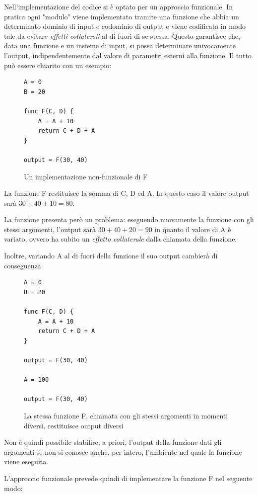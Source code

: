 \documentclass[11pt,a4paper]{report}
\newcommand{\name}[1]{{\ttfamily #1}}
\begin{document}
Nell'implementazione del codice si è optato per un approccio funzionale. In pratica ogni "modulo" viene implementato tramite una funzione che abbia un determinato dominio di input e codominio di output e viene codificata in modo tale da evitare \textit{effetti collaterali} al di fuori di se stessa. Questo garantisce che, data una funzione e un insieme di input, si possa determinare univocamente l'output, indipendentemente dal valore di parametri esterni alla funzione. Il tutto può essere chiarito con un esempio:

\begin{figure}[H]
\begin{lstlisting}
A = 0
B = 20

func F(C, D) {
	A = A + 10
	return C + D + A
}

output = F(30, 40)
\end{lstlisting}
\caption{Un implementazione non-funzionale di \name{F}}
\end{figure}

La funzione \name{F} restituisce la somma di \name{C}, \name{D} ed \name{A}. In questo caso il valore \name{output} sarà $30 + 40 + 10 = 80$.

La funzione presenta però un problema: eseguendo nuovamente la funzione con gli stessi argomenti, l'output sarà $30 + 40 + 20 = 90$ in quanto il valore di \name{A} è variato, ovvero ha subito un \textit{effetto collaterale} dalla chiamata della funzione.

Inoltre, variando \name{A} al di fuori della funzione il suo output cambierà di conseguenza

\begin{figure}[H]
\begin{lstlisting}
A = 0
B = 20

func F(C, D) {
	A = A + 10
	return C + D + A
}

output = F(30, 40)

A = 100

output = F(30, 40)
\end{lstlisting}
\caption{La stessa funzione \name{F}, chiamata con gli stessi argomenti in momenti diversi, restituisce output diversi}
\end{figure}

Non è quindi possibile stabilire, a priori, l'output della funzione dati gli argomenti se non si conosce anche, per intero, l'ambiente nel quale la funzione viene eseguita.

L'approccio funzionale prevede quindi di implementare la funzione \name{F} nel seguente modo:
\end{document}
